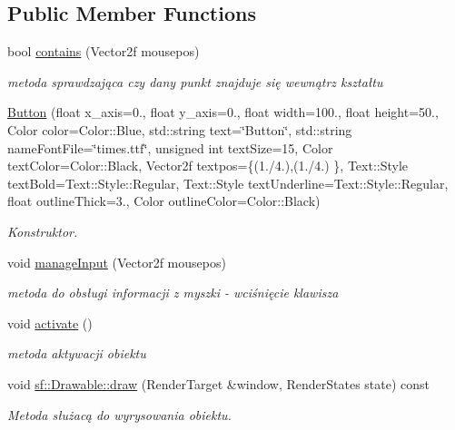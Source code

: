 \subsection*{Public Member Functions}
\begin{DoxyCompactItemize}
\item 
\mbox{\label{class_button_aa4d65bb2be09c8c2d4bb5a4739ff2ea7}} 
bool \mbox{\hyperlink{class_button_aa4d65bb2be09c8c2d4bb5a4739ff2ea7}{contains}} (Vector2f mousepos)
\begin{DoxyCompactList}\small\item\em metoda sprawdzająca czy dany punkt znajduje się wewnątrz kształtu \end{DoxyCompactList}\item 
\mbox{\hyperlink{class_button_a5f513f9c8fbe24e92fb26e98a32b41a3}{Button}} (float x\+\_\+axis=0., float y\+\_\+axis=0., float width=100., float height=50., Color color=Color\+::\+Blue, std\+::string text=\char`\"{}Button\char`\"{}, std\+::string name\+Font\+File=\char`\"{}times.\+ttf\char`\"{}, unsigned int text\+Size=15, Color text\+Color=Color\+::\+Black, Vector2f textpos=\{(1./4.),(1./4.) \}, Text\+::\+Style text\+Bold=Text\+::\+Style\+::\+Regular, Text\+::\+Style text\+Underline=Text\+::\+Style\+::\+Regular, float outline\+Thick=3., Color outline\+Color=Color\+::\+Black)
\begin{DoxyCompactList}\small\item\em Konstruktor. \end{DoxyCompactList}\item 
\mbox{\label{class_button_abf226e020dc9ca54d0b564d3549df013}} 
void \mbox{\hyperlink{class_button_abf226e020dc9ca54d0b564d3549df013}{manage\+Input}} (Vector2f mousepos)
\begin{DoxyCompactList}\small\item\em metoda do obsługi informacji z myszki -\/ wciśnięcie klawisza \end{DoxyCompactList}\item 
\mbox{\label{class_button_a2fe7d7228fb882c5c992ed07341d45be}} 
void \mbox{\hyperlink{class_button_a2fe7d7228fb882c5c992ed07341d45be}{activate}} ()
\begin{DoxyCompactList}\small\item\em metoda aktywacji obiektu \end{DoxyCompactList}\item 
void \mbox{\hyperlink{class_button_adc3b760f97deceaa28f742a433943815}{sf\+::\+Drawable\+::draw}} (Render\+Target \&window, Render\+States state) const
\begin{DoxyCompactList}\small\item\em Metoda służacą do wyrysowania obiektu. \end{DoxyCompactList}\end{DoxyCompactItemize}
